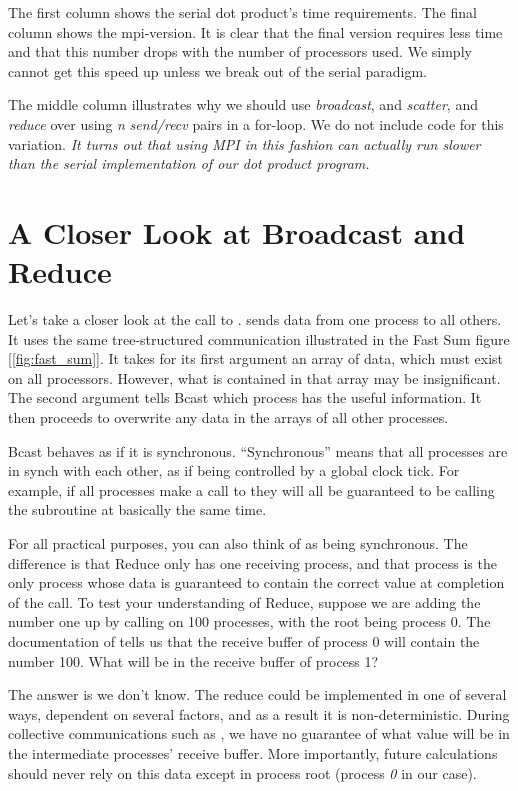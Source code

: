   The first column shows the serial dot product's time requirements. The final column shows the mpi-version. It is clear that the final version requires less time and that this number drops with the number of processors used. We simply cannot get this speed up unless we break out of the serial paradigm.

  The middle column illustrates why we should use \emph{broadcast}, and \emph{scatter}, and \emph{reduce} over using \emph{n} \emph{send/recv} pairs in a for-loop. We do not include code for this variation. \emph{It turns out that using MPI in this fashion can actually run slower than the serial implementation of our dot product program.}



\section*{A Closer Look at Broadcast and Reduce}
  Let's take a closer look at the call to .  sends data from one process to all others. It uses the same tree-structured communication illustrated in the Fast Sum figure [\ref{fig:fast_sum}]. It takes for its first argument an array of data, which must exist on all processors. However, what is contained in that array may be insignificant. The second argument tells Bcast which process has the useful information. It then proceeds to overwrite any data in the arrays of all other processes.

  Bcast behaves as if it is synchronous. ``Synchronous'' means that all processes are in synch with each other, as if being controlled by a global clock tick. For example, if all processes make a call to  they will all be guaranteed to be calling the subroutine at basically the same time.

  For all practical purposes, you can also think of  as being synchronous. The difference is that Reduce only has one receiving process, and that process is the only process whose data is guaranteed to contain the correct value at completion of the call. To test your understanding of Reduce, suppose we are adding the number one up by calling  on 100 processes, with the root being process 0. The documentation of  tells us that the receive buffer of process 0 will contain the number 100. What will be in the receive buffer of process 1?

  The answer is we don't know. The reduce could be implemented in one of several ways, dependent on several factors, and as a result it is non-deterministic. During collective communications such as , we have no guarantee of what value will be in the intermediate processes' receive buffer. More importantly, future calculations should never rely on this data except in process root (process \emph{0} in our case).


